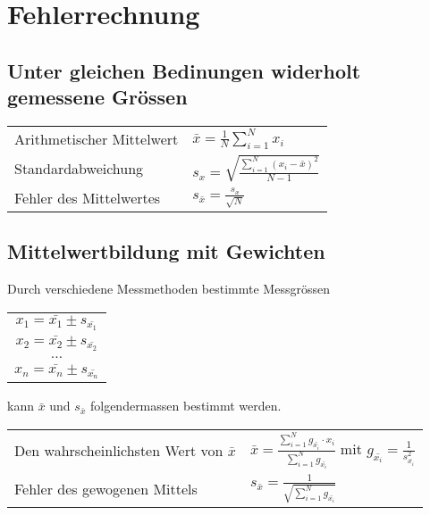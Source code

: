 \section{Fehlerrechnung}

\subsection{Unter gleichen Bedinungen widerholt gemessene Gr\"ossen}

\bgroup
    \def\arraystretch{1.8}
    \begin{tabular}{ll}
        Arithmetischer Mittelwert &  $ \bar{x} = \frac{1}{N} \sum_{i=1}^{N} x_i $ \\
        Standardabweichung        &  $s_x = \sqrt{ \frac{ \sum_{i=1}^{N} (x_i - \bar{x})^2 }{ N-1 } }$ \\
        Fehler des Mittelwertes   &  $s_{\bar{x}} = \frac{ s_x }{ \sqrt{N} }$ \\
    \end{tabular}
\egroup


\subsection{Mittelwertbildung mit Gewichten}

Durch verschiedene Messmethoden bestimmte Messgr\"ossen

\begin{tabular}{c}
    $x_1 = \bar{x_1} \pm s_{\bar{x_1}}$ \\
    $x_2 = \bar{x_2} \pm s_{\bar{x_2}}$ \\
    $\ldots$                            \\
    $x_n = \bar{x_n} \pm s_{\bar{x_n}}$ \\
\end{tabular}

kann $\bar{x}$ und $s_{\bar{x}}$ folgendermassen bestimmt werden.

\bgroup
    \def\arraystretch{1.8}
    \begin{tabular}{ll}
        Den wahrscheinlichsten Wert von $\bar{x}$  &  $\bar{x} = \frac{ \sum_{i=1}^{N} g_{\bar{x_i}} \cdot x_i }{ \sum_{i=1}^{N} g_{\bar{x_i}} }$ mit $g_{\bar{x_i}} = \frac{1}{s_{\bar{x_i}}^2}$ \\
        Fehler des gewogenen Mittels               &  $s_{\bar{x}} = \frac{1}{\sqrt{\sum_{i=1}^{N} g_{\bar{x_i}}}}$ \\
    \end{tabular}
\egroup


